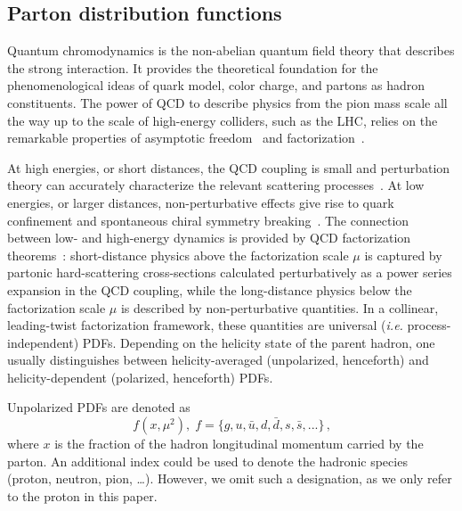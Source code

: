 \subsection{Parton distribution functions}
\label{Sec:IntroPDFs}

Quantum chromodynamics is the non-abelian quantum field 
theory that describes the strong interaction.
%
It provides the theoretical foundation for the phenomenological ideas of 
quark model, color charge, and partons as hadron constituents.
%
The power of QCD to describe physics from the pion mass scale all the way up 
to the scale of high-energy colliders, such as the LHC, relies on the 
remarkable properties of asymptotic freedom~\cite{Gross:1973ju,Gross:1973id,
Gross:1974cs,Politzer:1974fr} and 
factorization~\cite{Collins:1987pm,Collins:1989gx}.

At high energies, or short distances, the QCD coupling is small 
and perturbation theory can accurately characterize the relevant scattering 
processes~\cite{Campbell:2006wx}.
%
At low energies, or larger distances, non-perturbative effects give rise to 
quark confinement and spontaneous chiral symmetry breaking~\cite{Gasser:1983yg}.
%
The connection between low- and high-energy dynamics is provided by QCD 
factorization theorems~\cite{Collins:1987pm,Collins:1989gx}: 
short-distance physics above the factorization scale $\mu$ is captured by 
partonic hard-scattering cross-sections calculated perturbatively as a 
power series expansion in the QCD coupling, while the 
long-distance physics below the factorization scale $\mu$ is described by 
non-perturbative quantities.
%
In a collinear, leading-twist factorization framework, these quantities are
universal ({\it i.e.} process-independent) PDFs.
%
Depending on the helicity state of the parent hadron, one usually 
distinguishes between helicity-averaged (unpolarized, henceforth)
and helicity-dependent (polarized, henceforth) PDFs.

Unpolarized PDFs are denoted as 
\begin{equation}
f(x,\mu^2)\mbox{,} \ \ f=\{g,u,\bar{u},d,\bar{d},s,\bar{s},...\}
\,\mbox{,}
\label{eq:unpPDFs}
\end{equation}
where $x$ is the fraction
of the hadron longitudinal momentum carried by the parton.
%
An additional index could be used to denote the hadronic species (proton,
neutron, pion, \dots).
%
However, we omit such a designation, as we only refer to the proton
in this paper.

